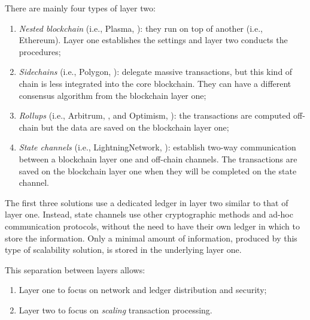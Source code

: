 There are mainly four types of layer two:
\begin{enumerate}
	\item \textit{Nested blockchain} (i.e., Plasma, \cite{site:plasma-ethereum}): they run on top of another 
	(i.e., Ethereum). Layer one establishes the settings and layer two conducts the procedures;
	\item \textit{Sidechains} (i.e., Polygon, \cite{site:polygon-ethereum}): delegate massive transactions, 
	but this kind of chain is less integrated into the core blockchain. They can have a different consensus 
	algorithm from the blockchain layer one;
	\item \textit{Rollups} (i.e., Arbitrum, \cite{site:arbitrum}, and Optimism, \cite{site:optimism}): the 
	transactions are computed off-chain but the data are saved on the blockchain layer one;
	\item \textit{State channels} (i.e., LightningNetwork, \cite{site:lightning-network}): establish two-way 
	communication between a blockchain layer one and off-chain channels. The transactions are saved on the 
	blockchain layer one when they will be completed on the state channel.
\end{enumerate}
The first three solutions use a dedicated ledger in layer two similar to that of layer one. Instead, state 
channels use other cryptographic methods and ad-hoc communication protocols, without the need to have 
their own ledger in which to store the information. Only a minimal amount of information, produced by this 
type of scalability solution, is stored in the underlying layer one.

This separation between layers allows:
\begin{enumerate}
	\item Layer one to focus on network and ledger distribution and security;
	\item Layer two to focus on \textit{scaling} transaction processing.
\end{enumerate}

